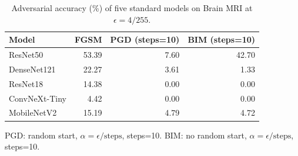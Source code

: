\begin{table}[htbp]
  \centering
  \caption{Adversarial accuracy (\%) of five standard models on Brain MRI at $\epsilon=4/255$.}
  \label{tab:brain_mri_robustness_eps4}
  \begin{tabular}{lrrr}
    \toprule
    Model & FGSM & PGD (steps=10) & BIM (steps=10) \\
    \midrule
    ResNet50        & 53.39 &  7.60 & 42.70 \\
    DenseNet121     & 22.27 &  3.61 &  1.33 \\
    ResNet18        & 14.38 &  0.00 &  0.00 \\
    ConvNeXt-Tiny   &  4.42 &  0.00 &  0.00 \\
    MobileNetV2     & 15.19 &  4.79 &  4.72 \\
    \bottomrule
  \end{tabular}
  \vspace{0.25em}
  \begin{minipage}{0.92\linewidth}
    \footnotesize
    PGD: random start, $\alpha=\epsilon/\text{steps}$, steps=10.
    BIM: no random start, $\alpha=\epsilon/\text{steps}$, steps=10.
  \end{minipage}
\end{table}
